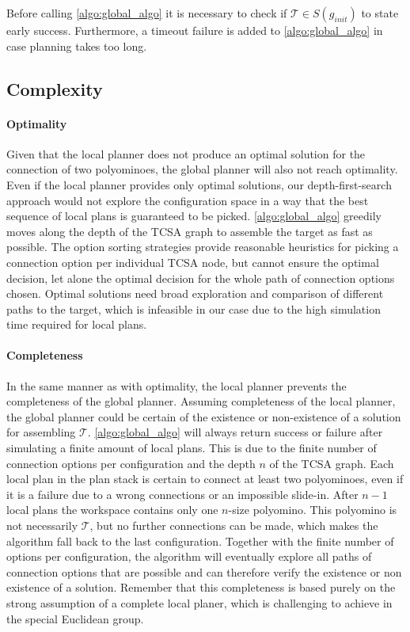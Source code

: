 Before calling \autoref{algo:global_algo} it is necessary to check if $\mathcal{T} \in S(g_\textit{init})$ to state early success.
Furthermore, a timeout failure is added to \autoref{algo:global_algo} in case planning takes too long.
 
\subsection{Complexity}
\label{sec:global_complex}

\paragraph{Optimality}

Given that the local planner does not produce an optimal solution for the connection of two polyominoes, the global planner will also not reach optimality.
Even if the local planner provides only optimal solutions, our depth-first-search approach would not explore the configuration space in a way that the best sequence of local plans is guaranteed to be picked.
\autoref{algo:global_algo} greedily moves along the depth of the TCSA graph to assemble the target as fast as possible.
The option sorting strategies provide reasonable heuristics for picking a connection option per individual TCSA node, but cannot ensure the optimal decision, let alone the optimal decision for the whole path of connection options chosen.
Optimal solutions need broad exploration and comparison of different paths to the target, which is infeasible in our case due to the high simulation time required for local plans.

\paragraph{Completeness}

In the same manner as with optimality, the local planner prevents the completeness of the global planner.
Assuming completeness of the local planner, the global planner could be certain of the existence or non-existence of a solution for assembling $\mathcal{T}$.
\autoref{algo:global_algo} will always return success or failure after simulating a finite amount of local plans.
This is due to the finite number of connection options per configuration and the depth $n$ of the TCSA graph.
Each local plan in the plan stack is certain to connect at least two polyominoes, even if it is a failure due to a wrong connections or an impossible slide-in.
After $n-1$ local plans the workspace contains only one $n$-size polyomino.
This polyomino is not necessarily $\mathcal{T}$, but no further connections can be made, which makes the algorithm fall back to the last configuration.
Together with the finite number of options per configuration, the algorithm will eventually explore all paths of connection options that are possible and can therefore verify the existence or non existence of a solution.
Remember that this completeness is based purely on the strong assumption of a complete local planer, which is challenging to achieve in the special Euclidean group.

